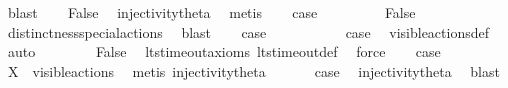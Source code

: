 \begin{isabellebody}
\ blast\isanewline
\ \ \isamarkupfalse%
\ False\ \isamarkupfalse%
\ injectivity{\isacharunderscore}{\kern0pt}theta{\isacharparenleft}{\kern0pt}{}{\isacharparenright}{\kern0pt}\ \isamarkupfalse%
\ metis\isanewline
\ \ \isamarkupfalse%
\ {\isacharquery}{\kern0pt}case\ \isacommand{{\isachardot}{\kern0pt}{\isachardot}{\kern0pt}}\isamarkupfalse%
\isanewline
{}\isamarkupfalse%
\isanewline
\ \ \isamarkupfalse%
\ {}\isanewline
\ \ \isamarkupfalse%
\ False\ \isamarkupfalse%
\ distinctness{\isacharunderscore}{\kern0pt}special{\isacharunderscore}{\kern0pt}actions\ \isamarkupfalse%
\ blast\isanewline
\ \ \isamarkupfalse%
\ {\isacharquery}{\kern0pt}case\ \isacommand{{\isachardot}{\kern0pt}{\isachardot}{\kern0pt}}\isamarkupfalse%
\isanewline
{}\isamarkupfalse%
\isanewline
\ \ \isamarkupfalse%
\ {}\isanewline
\ \ \isamarkupfalse%
\ \isamarkupfalse%
\ {\isacharquery}{\kern0pt}case\ \isamarkupfalse%
\ visible{\isacharunderscore}{\kern0pt}actions{\isacharunderscore}{\kern0pt}def\ \isamarkupfalse%
\ auto\isanewline
{}\isamarkupfalse%
\isanewline
\ \ \isamarkupfalse%
\ {}\isanewline
\ \ \isamarkupfalse%
\ False\ \isamarkupfalse%
\ lts{\isacharunderscore}{\kern0pt}timeout{\isacharunderscore}{\kern0pt}axioms\ lts{\isacharunderscore}{\kern0pt}timeout{\isacharunderscore}{\kern0pt}def\ \isamarkupfalse%
\ force\isanewline
\ \ \isamarkupfalse%
\ {\isacharquery}{\kern0pt}case\ \isacommand{{\isachardot}{\kern0pt}{\isachardot}{\kern0pt}}\isamarkupfalse%
\isanewline
{}\isamarkupfalse%
\isanewline
\ \ \isamarkupfalse%
\ {}\isanewline
\ \ \isamarkupfalse%
\ {\isacartoucheopen}X\ {\isasymsubseteq}\ visible{\isacharunderscore}{\kern0pt}actions{\isacartoucheclose}\ \isamarkupfalse%
\ {\isacharparenleft}{\kern0pt}metis\ injectivity{\isacharunderscore}{\kern0pt}theta{\isacharparenleft}{\kern0pt}{}{\isacharparenright}{\kern0pt}{\isacharparenright}{\kern0pt}\isanewline
\ \ \isamarkupfalse%
\ {}\ \isamarkupfalse%
\ {\isacharquery}{\kern0pt}case\ \isamarkupfalse%
\ injectivity{\isacharunderscore}{\kern0pt}theta{\isacharparenleft}{\kern0pt}{}{\isacharparenright}{\kern0pt}\ \isamarkupfalse%
\ blast\isanewline
{}\isamarkupfalse%
%
\endisatagproof
{\isafoldproof}%
%
\isadelimproof
\isanewline
%
\endisadelimproof
\isanewline
{}\isamarkupfalse%
\ %
%
\isadelimtheory
%
\endisadelimtheory
%
\isatagtheory
%
\endisatagtheory
{\isafoldtheory}%
%
\isadelimtheory
%
\endisadelimtheory
%
\end{isabellebody}%
